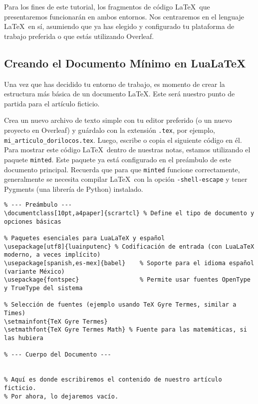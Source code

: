 Para los fines de este tutorial, los fragmentos de código \LaTeX\ que presentaremos funcionarán en ambos entornos.
Nos centraremos en el lenguaje \LaTeX\ en sí, asumiendo que ya has elegido y configurado tu plataforma de trabajo preferida o que estás utilizando Overleaf.

\subsection{Creando el Documento Mínimo en Lua\LaTeX}
\label{sub:documento_minimo_lualatex}

Una vez que has decidido tu entorno de trabajo, es momento de crear la estructura más básica de un documento \LaTeX.
Este será nuestro punto de partida para el artículo ficticio.

Crea un nuevo archivo de texto simple con tu editor preferido (o un nuevo proyecto en Overleaf) y guárdalo con la extensión \texttt{.tex}, por ejemplo, \texttt{mi\_articulo\_dorilocos.tex}.
Luego, escribe o copia el siguiente código en él.
Para mostrar este código \LaTeX\ dentro de nuestras notas, estamos utilizando el paquete \texttt{minted}.
Este paquete ya está configurado en el preámbulo de este documento principal.
Recuerda que para que \texttt{minted} funcione correctamente, generalmente se necesita compilar \LaTeX\ con la opción \texttt{-shell-escape} y tener Pygments (una librería de Python) instalado.

\begin{verbatim}
% --- Preámbulo ---
\documentclass[10pt,a4paper]{scrartcl} % Define el tipo de documento y opciones básicas

% Paquetes esenciales para LuaLaTeX y español
\usepackage[utf8]{luainputenc} % Codificación de entrada (con LuaLaTeX moderno, a veces implícito)
\usepackage[spanish,es-mex]{babel}    % Soporte para el idioma español (variante México)
\usepackage{fontspec}                 % Permite usar fuentes OpenType y TrueType del sistema

% Selección de fuentes (ejemplo usando TeX Gyre Termes, similar a Times)
\setmainfont{TeX Gyre Termes}
\setmathfont{TeX Gyre Termes Math} % Fuente para las matemáticas, si las hubiera

% --- Cuerpo del Documento ---


% Aquí es donde escribiremos el contenido de nuestro artículo ficticio.
% Por ahora, lo dejaremos vacío.


\end{verbatim}

